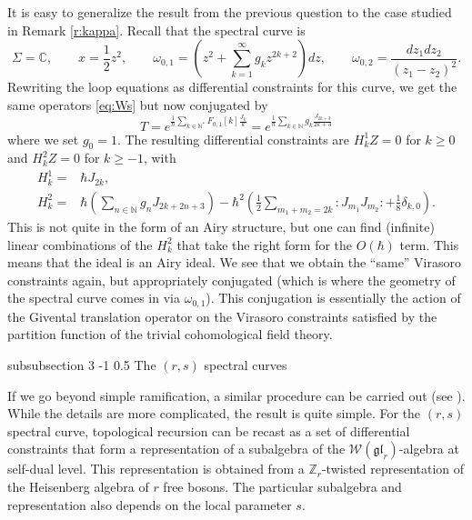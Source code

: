 \documentclass[reqno,oneside,11pt]{amsart}
\makeatletter
\theoremstyle{plain}
\theoremstyle{definition}
\theoremstyle{remark}
\numberwithin{equation}{section}
\renewcommand{\subsubsection}{\@startsection
{subsubsection}%
{3}%
{\z@}%
{-1\baselineskip}%
{0.5\baselineskip}%
{\normalfont \it \normalsize}} %
\makeatother
\begin{document}
It is easy to generalize the result from the previous question to the case studied in Remark \ref{r:kappa}. Recall that the spectral curve is
\begin{equation}
\Sigma=\mathbb{C}, \qquad x = \frac{1}{2}z^2, \qquad \omega_{0,1} =\left( z^2 + \sum_{k=1}^\infty g_k z^{2k+2} \right) dz, \qquad \omega_{0,2} = \frac{dz_1 dz_2}{(z_1-z_2)^2}.
\end{equation}
Rewriting the loop equations as differential constraints for this curve, we get the same operators \eqref{eq:Ws} but now conjugated by 
\begin{equation}
T = e^{\frac{1}{\hbar} \sum_{k \in \mathbb{N}^*} F_{0,1}[k] \frac{J_k}{k}}= e^{\frac{1}{\hbar} \sum_{k \in \mathbb{N}} g_k \frac{J_{2k+3}}{2k+3}}
\end{equation}
where we set $g_0 = 1$. The resulting differential constraints are $H^1_k Z = 0$ for $k \geq 0$ and $H^2_k Z = 0$ for $k \geq -1$, with
\begin{align}
H^1_k =& \hbar J_{2k},\nonumber\\
H^2_k =&  \hbar \left( \sum_{n \in \mathbb{N}} g_n J_{2k+2n+3}\right)- \hbar^2 \left( \frac{1}{2}\sum_{m_1+m_2 =2 k} : J_{m_1} J_{m_2}: + \frac{1}{8}\delta_{k,0} \right).
\end{align}
This is not quite in the form of an Airy structure, but one can find (infinite) linear combinations of the $H^2_k$ that take the right form for the $O(\hbar)$ term. This means that the ideal is an Airy ideal. We see that we obtain the ``same'' Virasoro constraints again, but appropriately conjugated (which is where the geometry of the spectral curve comes in via $\omega_{0,1}$). This conjugation is essentially the action of the Givental translation operator on the Virasoro constraints satisfied by the partition function of the trivial cohomological field theory.


\subsubsection{The $(r,s)$ spectral curves}

If we go beyond simple ramification, a similar procedure can be carried out (see \cite{BBCCN18}). While the details are more complicated, the result is quite simple. For the $(r,s)$ spectral curve, topological recursion can be recast as a set of differential constraints that form a representation of a subalgebra of the $\mathcal{W}(\mathfrak{gl}_r)$-algebra at self-dual level. This representation is obtained from a $\mathbb{Z}_r$-twisted representation of the Heisenberg algebra of $r$ free bosons. The particular subalgebra and representation also depends on the local parameter $s$. 
\end{document}
